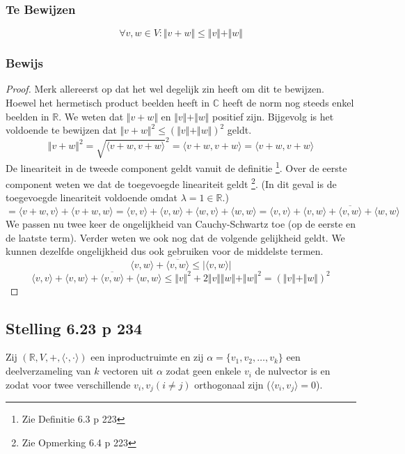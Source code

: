 \documentclass[lineaire_algebra_oplossingen.tex]{subfiles}
\begin{document}
\subsubsection*{Te Bewijzen}
\[
\forall v,w \in V: \Vert v+w \Vert \le \Vert v\Vert + \Vert w\Vert
\]

\subsubsection*{Bewijs}
\begin{proof}
Merk allereerst op dat het wel degelijk zin heeft om dit te bewijzen. Hoewel het hermetisch product beelden heeft in $\mathbb{C}$ heeft de norm nog steeds enkel beelden in $\mathbb{R}$.
We weten dat $\Vert v+w \Vert$ en $\Vert v\Vert + \Vert w\Vert$ positief zijn. Bijgevolg is het voldoende te bewijzen dat $\Vert v+w \Vert^2 \le (\Vert v\Vert + \Vert w\Vert)^2$ geldt.
\[
 \Vert v+w \Vert^2 = \sqrt{\langle v+w,v+w\rangle}^2 = \langle v+w,v+w\rangle = \langle v+w,v+w\rangle
\]
De lineariteit in de tweede component geldt vanuit de definitie \footnote{Zie Definitie 6.3 p 223}. Over de eerste component weten we dat de toegevoegde lineariteit geldt \footnote{Zie Opmerking 6.4 p 223}. (In dit geval is de toegevoegde lineariteit voldoende omdat $\lambda = 1 \in \mathbb{R}$.)
\[
= \langle v+w,v\rangle + \langle v+w,w\rangle = \langle v,v\rangle + \langle v,w\rangle + \langle w,v \rangle + \langle w,w \rangle = \langle v,v\rangle + \langle v,w\rangle + \overline{\langle v,w \rangle} + \langle w,w \rangle
\]
We passen nu twee keer de ongelijkheid van Cauchy-Schwartz toe (op de eerste en de laatste term). Verder weten we ook nog dat de volgende gelijkheid geldt. We kunnen dezelfde ongelijkheid dus ook gebruiken voor de middelste termen.
\[
\langle v,w\rangle + \overline{\langle v,w \rangle} \le \vert\langle v,w\rangle\vert
\]
\[
\langle v,v\rangle + \langle v,w\rangle + \overline{\langle v,w \rangle} + \langle w,w \rangle \le \Vert v\Vert^2 + 2\Vert v\Vert \Vert w\Vert + \Vert w\Vert^2 = (\Vert v\Vert + \Vert w\Vert)^2
\]
\end{proof}


\subsection{Stelling 6.23 p 234}
\label{6.23}
Zij $(\mathbb{R},V,+,\langle\cdot,\cdot\rangle)$ een inproductruimte en zij $\alpha = \{v_1,v_2,\ldots,v_k\}$ een deelverzameling van $k$ vectoren uit $\alpha$ zodat geen enkele $v_i$ de nulvector is en zodat voor twee verschillende $v_i,v_j (i\neq j)$ orthogonaal zijn ($\langle v_i,v_j \rangle = 0$). 
\end{document}
